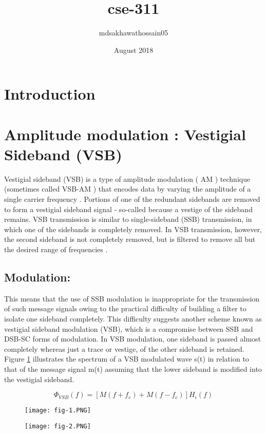\documentclass{article}
\title{cse-311}
\author{mdsakhawathossain05 }
\date{August 2018}
\begin{document}
\maketitle

\section{Introduction}

\section{Amplitude modulation : Vestigial Sideband (VSB)}
Vestigial sideband (VSB) is a type of amplitude modulation ( AM ) technique (sometimes called VSB-AM ) that encodes data by varying the amplitude of a single carrier frequency . Portions of one of the redundant sidebands are removed to form a vestigial sideband signal - so-called because a vestige of the sideband remains.
VSB transmission is similar to single-sideband (SSB) transmission, in which one of the sidebands is completely removed. In VSB transmission, however, the second sideband is not completely removed, but is filtered to remove all but the desired range of frequencies .
\subsection{Modulation:}
This means that the use of SSB modulation is inappropriate for the transmission of such message signals owing to the practical difficulty of building a filter to isolate one sideband completely.
This difficulty suggests another scheme known as vestigial sideband modulation (VSB), which is a compromise between SSB and DSB-SC forms of modulation. In VSB modulation, one sideband is passed almost completely whereas just a trace or vestige, of the other sideband is retained. Figure \ref{fig:1} illustrates the spectrum of a VSB modulated wave s(t) in relation to that of the message signal m(t) assuming that the lower sideband is modified into the vestigial sideband.

\begin{equation}
    \Phi_{VSB}(f) = [M(f+f_c) + M(f-f_c)]H_i(f)
\end{equation}

\begin{figure}
    \centering
    \texttt{[image: fig-1.PNG]}
    \caption{}
    \label{fig:1}
\end{figure}
\begin{figure}
    \centering
    \texttt{[image: fig-2.PNG]}
    \caption{}
    \label{fig:2}
\end{figure}
\end{document}
